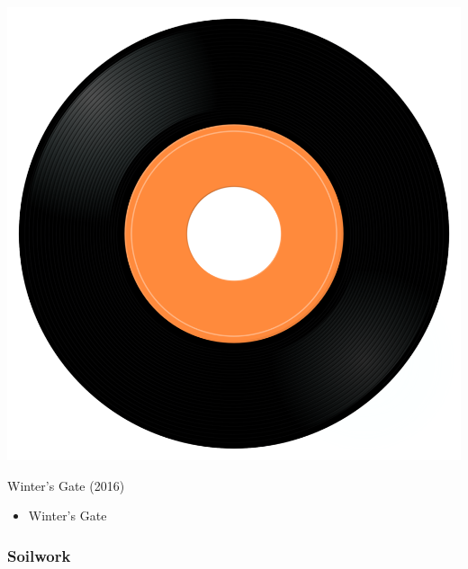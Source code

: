 \begin{minipage}[t]{0.25\textwidth}\vspace{0pt}
\captionsetup{type=figure}
\includegraphics[width=\textwidth]{Images/cover.png}
\caption*{Winter's Gate (2016)}
\end{minipage}
\begin{minipage}[t]{0.25\textwidth}\vspace{0pt}
\begin{itemize}[nosep,leftmargin=1em,labelwidth=*,align=left]
	\setlength{\itemsep}{0pt}
	\item Winter's Gate
\end{itemize}
\end{minipage}

\subsubsection{Soilwork}

